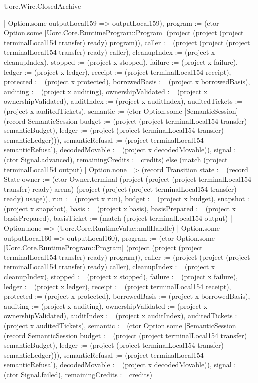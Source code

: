 \begin{lexlean}{Uorc.Wire.ClosedArchive}
\begin{semanticmodule}
{{{            | Option.some outputLocal159 => outputLocal159), program := (ctor Option.some [Uorc.Core.RuntimeProgram::Program] (project (project (project terminalLocal154 transfer) ready) program)), caller := (project (project (project terminalLocal154 transfer) ready) caller), cleanupIndex := (project x cleanupIndex), stopped := (project x stopped), failure := (project x failure), ledger := (project x ledger), receipt := (project terminalLocal154 receipt), protected := (project x protected), borrowedBasis := (project x borrowedBasis), auditing := (project x auditing), ownershipValidated := (project x ownershipValidated), auditIndex := (project x auditIndex), auditedTickets := (project x auditedTickets), semantic := (ctor Option.some [SemanticSession] (record SemanticSession {budget := (project (project terminalLocal154 transfer) semanticBudget), ledger := (project (project terminalLocal154 transfer) semanticLedger)})), semanticRefusal := (project terminalLocal154 semanticRefusal), decodedMovable := (project x decodedMovable)}), signal := (ctor Signal.advanced), remainingCredits := credits}) else (match (project terminalLocal154 output)
            | Option.none => (record Transition {state := (record State {owner := (ctor Owner.terminal (project (project (project terminalLocal154 transfer) ready) arena) (project (project (project terminalLocal154 transfer) ready) usage)), run := (project x run), budget := (project x budget), snapshot := (project x snapshot), basis := (project x basis), basisPrepared := (project x basisPrepared), basisTicket := (match (project terminalLocal154 output)
              | Option.none => (Uorc.Core.RuntimeValue::nullHandle)
              | Option.some outputLocal160 => outputLocal160), program := (ctor Option.some [Uorc.Core.RuntimeProgram::Program] (project (project (project terminalLocal154 transfer) ready) program)), caller := (project (project (project terminalLocal154 transfer) ready) caller), cleanupIndex := (project x cleanupIndex), stopped := (project x stopped), failure := (project x failure), ledger := (project x ledger), receipt := (project terminalLocal154 receipt), protected := (project x protected), borrowedBasis := (project x borrowedBasis), auditing := (project x auditing), ownershipValidated := (project x ownershipValidated), auditIndex := (project x auditIndex), auditedTickets := (project x auditedTickets), semantic := (ctor Option.some [SemanticSession] (record SemanticSession {budget := (project (project terminalLocal154 transfer) semanticBudget), ledger := (project (project terminalLocal154 transfer) semanticLedger)})), semanticRefusal := (project terminalLocal154 semanticRefusal), decodedMovable := (project x decodedMovable)}), signal := (ctor Signal.failed), remainingCredits := credits})
}
\end{semanticmodule}
\end{lexlean}
